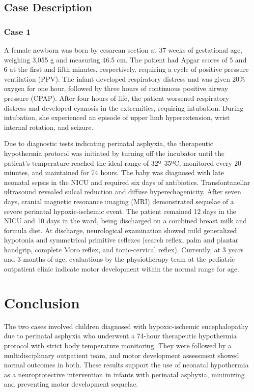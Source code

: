 \documentclass[11pt,a4paper]{article}
\begin{document}
	\subsection{Case Description}
	\subsubsection{Case 1}
	A female newborn was born by cesarean section at 37 weeks of gestational age, weighing 3,055 g and measuring 46.5 cm. The patient had Apgar scores of 5 and 6 at the first and fifth minutes, respectively, requiring a cycle of positive pressure ventilation (PPV). The infant developed respiratory distress and was given 20\% oxygen for one hour, followed by three hours of continuous positive airway pressure (CPAP). After four hours of life, the patient worsened respiratory distress and developed cyanosis in the extremities, requiring intubation. During intubation, she experienced an episode of upper limb hyperextension, wrist internal rotation, and seizure.
	
	Due to diagnostic tests indicating perinatal asphyxia, the therapeutic hypothermia protocol was initiated by turning off the incubator until the patient’s temperature reached the ideal range of 32º–35ºC, monitored every 20 minutes, and maintained for 74 hours. The baby was diagnosed with late neonatal sepsis in the NICU and required six days of antibiotics. Transfontanellar ultrasound revealed sulcal reduction and diffuse hyperechogenicity. After seven days, cranial magnetic resonance imaging (MRI) demonstrated sequelae of a severe perinatal hypoxic-ischemic event. The patient remained 12 days in the NICU and 10 days in the ward, being discharged on a combined breast milk and formula diet. At discharge, neurological examination showed mild generalized hypotonia and symmetrical primitive reflexes (search reflex, palm and plantar handgrip, complete Moro reflex, and tonic-cervical reflex). Currently, at 3 years and 3 months of age, evaluations by the physiotherapy team at the pediatric outpatient clinic indicate motor development within the normal range for age.
		
	\section{Conclusion}
	The two cases involved children diagnosed with hypoxic-ischemic encephalopathy due to perinatal asphyxia who underwent a 74-hour therapeutic hypothermia protocol with strict body temperature monitoring. They were followed by a multidisciplinary outpatient team, and motor development assessment showed normal outcomes in both. These results support the use of neonatal hypothermia as a neuroprotective intervention in infants with perinatal asphyxia, minimizing and preventing motor development sequelae.
	
	\newpage
	
	\printbibliography[title=References]
		
\end{document}
